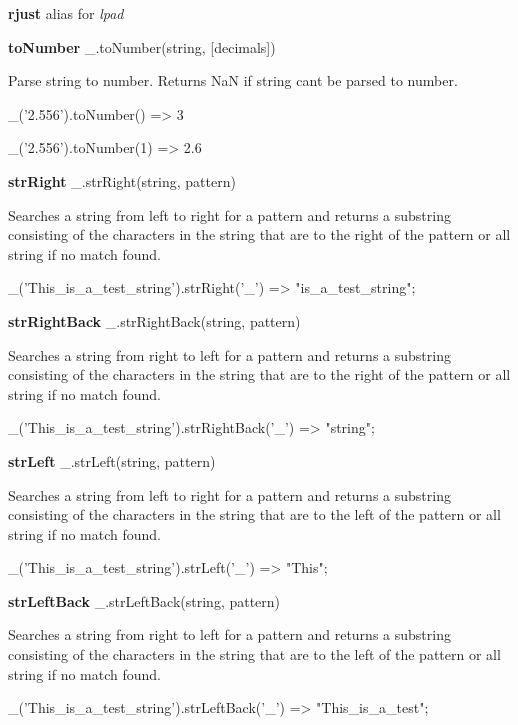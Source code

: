 {\bfseries rjust} alias for {\itshape lpad}

{\bfseries to\+Number} \+\_\+.\+to\+Number(string, \mbox{[}decimals\mbox{]})

Parse string to number. Returns NaN if string can\textquotesingle{}t be parsed to number.


\begin{DoxyCode}
\_('2.556').toNumber()
=> 3

\_('2.556').toNumber(1)
=> 2.6
\end{DoxyCode}


{\bfseries str\+Right} \+\_\+.\+str\+Right(string, pattern)

Searches a string from left to right for a pattern and returns a substring consisting of the characters in the string that are to the right of the pattern or all string if no match found.


\begin{DoxyCode}
\_('This\_is\_a\_test\_string').strRight('\_')
=> "is\_a\_test\_string";
\end{DoxyCode}


{\bfseries str\+Right\+Back} \+\_\+.\+str\+Right\+Back(string, pattern)

Searches a string from right to left for a pattern and returns a substring consisting of the characters in the string that are to the right of the pattern or all string if no match found.


\begin{DoxyCode}
\_('This\_is\_a\_test\_string').strRightBack('\_')
=> "string";
\end{DoxyCode}


{\bfseries str\+Left} \+\_\+.\+str\+Left(string, pattern)

Searches a string from left to right for a pattern and returns a substring consisting of the characters in the string that are to the left of the pattern or all string if no match found.


\begin{DoxyCode}
\_('This\_is\_a\_test\_string').strLeft('\_')
=> "This";
\end{DoxyCode}


{\bfseries str\+Left\+Back} \+\_\+.\+str\+Left\+Back(string, pattern)

Searches a string from right to left for a pattern and returns a substring consisting of the characters in the string that are to the left of the pattern or all string if no match found.


\begin{DoxyCode}
\_('This\_is\_a\_test\_string').strLeftBack('\_')
=> "This\_is\_a\_test";
\end{DoxyCode}


